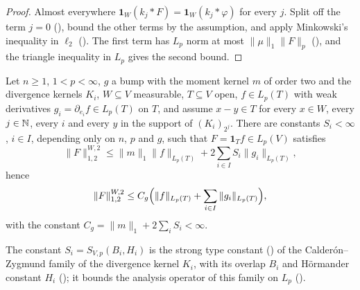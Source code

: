 \begin{proof}
\leanok
Almost everywhere $\mathbf 1_W (k_j * F) = \mathbf 1_W (k_j * \varphi)$ for every $j$. Split off
the term $j = 0$ (), bound the other terms by the assumption, and apply
Minkowski's inequality in $\ell_2$ (). The first term has $L_p$ norm
at most $\|\mu\|_1 \|F\|_p$ (), and the triangle inequality in $L_p$
gives the second bound.
\end{proof}

\begin{theorem}
\label{thm:tl-local-means-gradient}
\leanok
{}
Let $n \geq 1$, $1 < p < \infty$, $g$ a bump with the moment kernel $m$ of order two and the
divergence kernels $K_i$, $W \subseteq V$ measurable, $T \subseteq V$ open, $f \in L_p(T)$ with
weak derivatives $g_i = \partial_{e_i} f \in L_p(T)$ on $T$, and assume $x - y \in T$ for every
$x \in W$, every $j \in \mathbb{N}$, every $i$ and every $y$ in the support of $(K_i)_{2^j}$. There are
constants $S_i < \infty$, $i \in I$, depending only on $n$, $p$ and $g$, such that
$F = \mathbf 1_T f \in L_p(V)$ satisfies
\[
  \|F\|^{W,2}_{1,2} \leq \|m\|_1 \|f\|_{L_p(T)} + 2 \sum_{i \in I} S_i \|g_i\|_{L_p(T)} ,
\]
hence
\[
  \|F\|^{W,2}_{1,2} \leq C_g \Bigl(\|f\|_{L_p(T)} + \sum_{i \in I} \|g_i\|_{L_p(T)}\Bigr) ,
\]
with the constant $C_g = \|m\|_1 + 2 \sum_i S_i < \infty$.
\end{theorem}

The constant $S_i = S_{V,p}(B_i, H_i)$ is the strong type constant () of the
Calder\'on--Zygmund family of the divergence kernel $K_i$, with its overlap $B_i$ and
H\"ormander constant $H_i$ (); it bounds the analysis operator
of this family on $L_p$ ().

